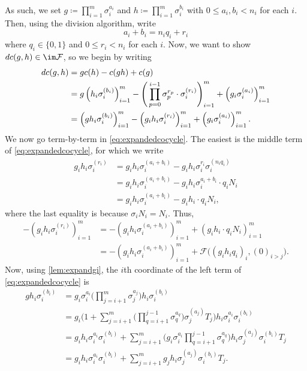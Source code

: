 \documentclass{article}
\numberwithin{equation}{section}
\begin{document}
As such, we set $g\coloneqq\prod_{i=1}^m\sigma_i^{a_i}$ and $h\coloneqq\prod_{i=1}^m\sigma_i^{b_i}$ with $0\le a_i,b_i<n_i$ for each $i$. Then, using the division algorithm, write
\[a_i+b_i=n_iq_i+r_i\]
where $q_i\in\{0,1\}$ and $0\le r_i<n_i$ for each $i$. Now, we want to show $dc(g,h)\in\im\mathcal F$, so we begin by writing
\begin{align}
	dc(g,h) &= gc(h)-c(gh)+c(g) \notag \\
	&= g\left(h_i\sigma_i^{(b_i)}\right)_{i=1}^m-\Bigg(\prod_{p=0}^{i-1}\sigma_p^{r_p}\cdot\sigma_i^{(r_i)}\Bigg)_{i=1}^m+\left(g_i\sigma_i^{(a_i)}\right)_{i=1}^m \notag \\
	&= \left(gh_i\sigma_i^{(b_i)}\right)_{i=1}^m-\left(g_ih_i\sigma_i^{(r_i)}\right)_{i=1}^m+\left(g_i\sigma_i^{(a_i)}\right)_{i=1}^m. \label{eq:expandedcocycle}
\end{align}
We now go term-by-term in \autoref{eq:expandedcocycle}. The easiest is the middle term of \autoref{eq:expandedcocycle}, for which we write
\begin{align*}
	g_ih_i\sigma_i^{(r_i)} &= g_ih_i\sigma_i^{(a_i+b_i)}-g_ih_i\sigma_i^{r_i}\sigma_i^{(n_iq_i)} \\
	&= g_ih_i\sigma_i^{(a_i+b_i)}-g_ih_i\sigma_i^{a_i+b_i}\cdot q_iN_i \\
	&= g_ih_i\sigma_i^{(a_i+b_i)}-g_ih_i\cdot q_iN_i,
\end{align*}
where the last equality is because $\sigma_iN_i=N_i$. Thus,
\begin{align*}
	-\left(g_ih_i\sigma_i^{(r_i)}\right)_{i=1}^m &= -\left(g_ih_i\sigma_i^{(a_i+b_i)}\right)_{i=1}^m+\left(g_ih_i\cdot q_iN_i\right)_{i=1}^m \\
	&= -\left(g_ih_i\sigma_i^{(a_i+b_i)}\right)_{i=1}^m+\mathcal F\big((g_ih_iq_i)_i,(0)_{i>j}\big).
\end{align*}
Now, using \autoref{lem:expandgi}, the $i$th coordinate of the left term of \autoref{eq:expandedcocycle} is
\begin{align*}
	gh_i\sigma_i^{(b_i)} &= g_i\sigma_i^{a_i}\Bigg(\prod_{ j=i+1}^{m}\sigma_j^{a_j}\Bigg)h_i\sigma_i^{(b_i)} \\
	&= g_i\Bigg(1+\sum_{j=i+1}^{m}\Bigg(\prod_{q=i+1}^{j-1}\sigma_q^{a_q}\Bigg)\sigma_j^{(a_j)}T_j\Bigg)h_i\sigma_i^{a_i}\sigma_i^{(b_i)} \\
	&= g_ih_i\sigma_i^{a_i}\sigma_i^{(b_i)}+\sum_{j=i+1}^{m}\Bigg(g_i\sigma_i^{a_i}\prod_{q=i+1}^{j-1}\sigma_q^{a_q}\Bigg)h_i\sigma_j^{(a_j)}\sigma_i^{(b_i)}T_j \\
	&= g_ih_i\sigma_i^{a_i}\sigma_i^{(b_i)}+\sum_{j=i+1}^{m}g_jh_i\sigma_j^{(a_j)}\sigma_i^{(b_i)}T_j.
\end{align*}
\end{document}
